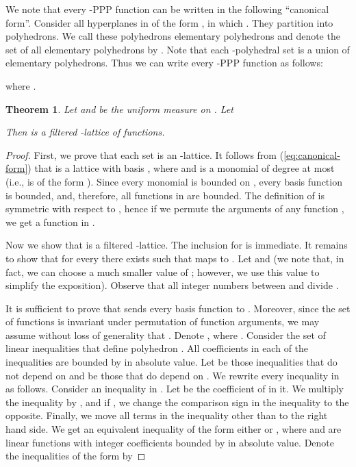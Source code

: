 \documentclass[11pt]{article}
\newtheorem{theorem}{Theorem}
\begin{document}
We note that every -PPP function can be written in the following ``canonical form''. Consider all hyperplanes in  of the form ,
in which . They partition  into polyhedrons. We call these polyhedrons elementary polyhedrons and denote the set of all
elementary polyhedrons by . Note that each -polyhedral set is a union of elementary polyhedrons.
Thus we can write every -PPP function  as follows:

where .


\begin{theorem}\label{thm:PPP-is-FAL}
Let  and  be the uniform measure on .
Let

Then  is a filtered -lattice of functions.
\end{theorem}
\begin{proof}
First, we prove  that each set  is an -lattice.
It follows from (\ref{eq:canonical-form}) that  is a lattice with basis ,
where  and  is a monomial of degree at most  (i.e.,  is of the form ).
Since every monomial  is bounded on , every basis function is bounded, and, therefore, all functions in  are bounded.
The definition of  is symmetric with respect to , hence if we permute the arguments of any function ,
we get a function in .

Now we show that  is a filtered -lattice. The inclusion  for  is immediate.
It remains to show that for every  there exists  such that  maps  to .
Let  and  (we note that, in fact, we can choose a much smaller value of ;
 however, we use this value to simplify the exposition). Observe  that all integer numbers between  and  divide .

It is sufficient to prove that  sends every basis function
 to .
Moreover, since the set of functions  is invariant under permutation of function arguments, we may assume without loss of generality that .
Denote , where .
Consider the set of linear inequalities  that define polyhedron . All coefficients in each of the inequalities are bounded by  in absolute value.
Let  be those inequalities that do not depend on  and  be those that do depend on .
We rewrite every inequality in  as follows. Consider an inequality in . Let  be the coefficient of  in it.
We multiply the inequality by , and if , we change the comparison sign in the inequality to the opposite.
Finally, we move all terms in the inequality other than  to the right hand side.
We get an equivalent inequality of the form either  or ,
where  and  are linear functions with integer coefficients bounded by  in absolute value.
Denote the inequalities of the form  by


\end{proof}
\end{document}
